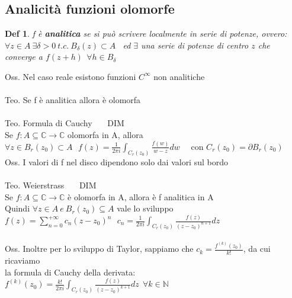 \documentclass{article}
\theoremstyle{unnumbered}
\newtheorem* {theoremT}{Def}
\theoremstyle{unnumbered1}
\newenvironment{defi}{\begin{gBox}\begin{theoremT}}{\end{theoremT}\end{gBox}}
\begin{document}
\subsection{Analicità funzioni olomorfe}
%
\begin{defi}
f è \textbf{analitica} se si può scrivere localmente in serie di potenze, ovvero:\\
$\forall z \in A \ \exists\delta>0 \ t.c. \ B_{\delta}(z)\subset A$ \
ed $\exists$ una serie di potenze di centro $z$ che converge a $f(z+h) \ \ \forall h\in B_{\delta}$
\end{defi}
%
Oss. Nel caso reale esistono funzioni $C^{\infty}$ non analitiche \\ \\
%
Teo. Se f è analitica allora è olomorfa\\ \\
%
Teo. Formula di Cauchy \ \ \ DIM\\
Se $f:A\subseteq\mathbb{C}\rightarrow\mathbb{C}$ olomorfa in A, allora $\forall z \in B_r(z_0)\subset A \ \ \ f(z)= \frac{1}{2\pi i} \int_{C_r(z_0)} \frac{f(w)}{w-z}dw $ \ \ con $C_r(z_0) = \partial B_r(z_0)$\\
%
Oss. I valori di f nel disco dipendono solo dai valori sul bordo\\ \\
%
Teo. Weierstrass \ \ \ DIM\\
Se $f:A\subseteq\mathbb{C}\rightarrow\mathbb{C}$ è olomorfa in A, allora è f analitica in A\\
Quindi $\forall z \in A \ e \ B_r(z_0)\subseteq A$ vale lo sviluppo \ $f(z)=\sum_{n=0}^{+\infty}c_n(z-z_0)^n \ \ \ c_n=\frac{1}{2\pi i} \int_{C_r(z_0)} \frac{f(z)}{(z-z_0)^{n+1}}dz$\\ \\
%
Oss. Inoltre per lo sviluppo di Taylor, sappiamo che $c_k=\frac{f^{(k)}(z_0)}{k!}$, da cui ricaviamo\\ la formula di Cauchy della derivata: \ \ $f^{(k)}(z_0)=\frac{k!}{2\pi i}\int_{C_r(z_0)}\frac{f(z)}{(z-z_0)^{k+1}}dz \ \ \forall k\in\mathbb{N}$ \\
%
%
\end{document}

